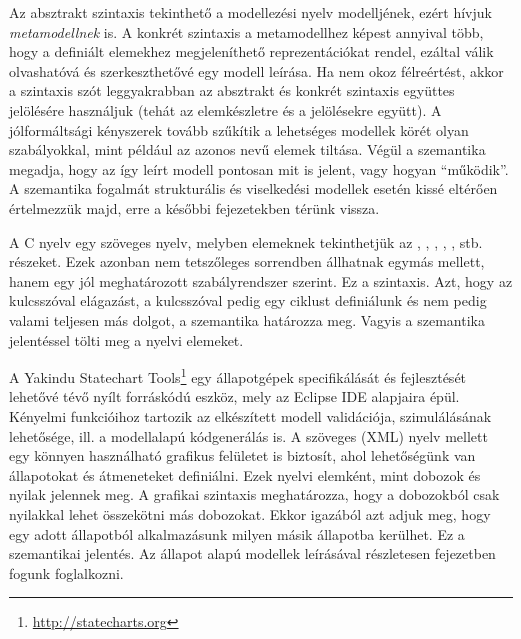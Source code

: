 Az absztrakt szintaxis tekinthető a modellezési nyelv modelljének, ezért hívjuk \emph{metamodellnek} is. A konkrét szintaxis a metamodellhez képest annyival több, hogy a definiált elemekhez megjeleníthető reprezentációkat rendel, ezáltal válik olvashatóvá és szerkeszthetővé egy modell leírása. Ha nem okoz félreértést, akkor a szintaxis szót leggyakrabban az absztrakt és konkrét szintaxis együttes jelölésére használjuk (tehát az elemkészletre és a jelölésekre együtt). A jólformáltsági kényszerek tovább szűkítik a lehetséges modellek körét olyan szabályokkal, mint például az azonos nevű elemek tiltása. Végül a szemantika megadja, hogy az így leírt modell pontosan mit is jelent, vagy hogyan ``működik''. A szemantika fogalmát strukturális és viselkedési modellek esetén kissé eltérően értelmezzük majd, erre a későbbi fejezetekben térünk vissza.

\begin{pelda}
	A C nyelv egy szöveges nyelv, melyben elemeknek tekinthetjük az , , , , ,  stb. részeket. Ezek azonban nem tetszőleges sorrendben állhatnak egymás mellett, hanem egy jól meghatározott szabályrendszer szerint. Ez a szintaxis. Azt, hogy az  kulcsszóval elágazást, a  kulcsszóval pedig egy ciklust definiálunk és nem pedig valami teljesen más dolgot, a szemantika határozza meg. Vagyis a szemantika jelentéssel tölti meg a nyelvi elemeket.
\end{pelda}

\begin{pelda}
	A Yakindu Statechart Tools\footnote{\url{http://statecharts.org}} egy állapotgépek specifikálását és fejlesztését lehetővé tévő nyílt forráskódú eszköz, mely az Eclipse IDE alapjaira épül. Kényelmi funkcióihoz tartozik az elkészített modell validációja, szimulálásának lehetősége, ill. a modellalapú kódgenerálás is. A szöveges (XML) nyelv mellett egy könnyen használható grafikus felületet is biztosít, ahol lehetőségünk van állapotokat és átmeneteket definiálni. Ezek nyelvi elemként, mint dobozok és nyilak jelennek meg. A grafikai szintaxis meghatározza, hogy a dobozokból csak nyilakkal lehet összekötni más dobozokat. Ekkor igazából azt adjuk meg, hogy egy adott állapotból alkalmazásunk milyen másik állapotba kerülhet. Ez a szemantikai jelentés. Az állapot alapú modellek leírásával részletesen  fejezetben fogunk foglalkozni.
\end{pelda}

